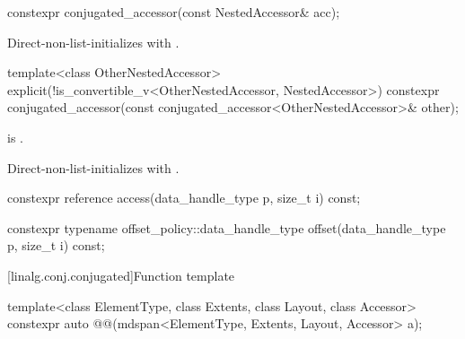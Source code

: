%
\begin{itemdecl}
constexpr conjugated_accessor(const NestedAccessor& acc);
\end{itemdecl}

\begin{itemdescr}
\pnum
\effects
Direct-non-list-initializes
 with .
\end{itemdescr}

%
\begin{itemdecl}
template<class OtherNestedAccessor>
  explicit(!is_convertible_v<OtherNestedAccessor, NestedAccessor>)
    constexpr conjugated_accessor(const conjugated_accessor<OtherNestedAccessor>& other);
\end{itemdecl}

\begin{itemdescr}
\pnum
\constraints
{}
is .

\pnum
\effects
Direct-non-list-initializes 
with .
\end{itemdescr}

%
\begin{itemdecl}
constexpr reference access(data_handle_type p, size_t i) const;
\end{itemdecl}

\begin{itemdescr}
\pnum
\returns
{}
\end{itemdescr}

%
\begin{itemdecl}
constexpr typename offset_policy::data_handle_type offset(data_handle_type p, size_t i) const;
\end{itemdecl}

\begin{itemdescr}
\pnum
\returns
{}
\end{itemdescr}

[linalg.conj.conjugated]{Function template }

\begin{itemdecl}
  template<class ElementType, class Extents, class Layout, class Accessor>
    constexpr auto @@(mdspan<ElementType, Extents, Layout, Accessor> a);
\end{itemdecl}

